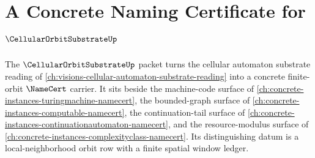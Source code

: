 \chapter{A Concrete Naming Certificate for $\CellularOrbitSubstrateUp$}
\label{ch:concrete-instances-cellularorbitsubstrate-namecert}

The $\CellularOrbitSubstrateUp$ packet turns the cellular automaton substrate reading of \autoref{ch:visions-cellular-automaton-substrate-reading} into a concrete finite-orbit $\NameCert$ carrier. It sits beside the machine-code surface of \autoref{ch:concrete-instances-turingmachine-namecert}, the bounded-graph surface of \autoref{ch:concrete-instances-computable-namecert}, the continuation-tail surface of \autoref{ch:concrete-instances-continuationautomaton-namecert}, and the resource-modulus surface of \autoref{ch:concrete-instances-complexityclass-namecert}. Its distinguishing datum is a local-neighborhood orbit row with a finite spatial window ledger.



